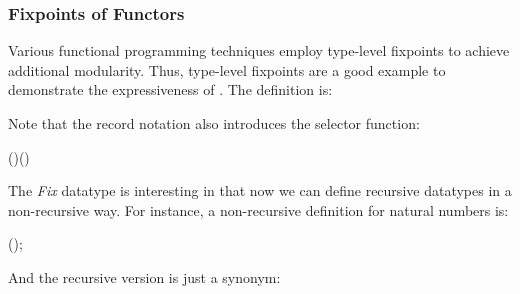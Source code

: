\subsubsection{Fixpoints of Functors}
Various functional programming techniques employ type-level
fixpoints to achieve additional modularity.
Thus, type-level fixpoints are a good example to demonstrate the
expressiveness of \sufcc. The definition is:
\resethooks
Note that the record notation also introduces the selector function:
\begin{hscode}\SaveRestoreHook
{}%
%
%
\>[3]{}\mathbin{:}(\mathbin{:}\star\to \star)\to {}\;\to {}\;(\;){}\<[E]%
\ColumnHook
\end{hscode}\resethooks
The \emph{Fix} datatype is interesting in that now we can define
recursive datatypes in a non-recursive way. For instance, a
non-recursive definition for natural numbers is:
\begin{hscode}\SaveRestoreHook
{}%
%
%
\>[3]{}\;\;(\mathbin{:}\star)\mathrel{=}\mid {}\;;{}\<[E]%
\ColumnHook
\end{hscode}\resethooks
And the recursive version is just a synonym:
\begin{hscode}\SaveRestoreHook
{}%
%
%
\>[3]{}\;\mathbin{:}\star\mathrel{=}\;\<[E]%
\ColumnHook
\end{hscode}\resethooks

